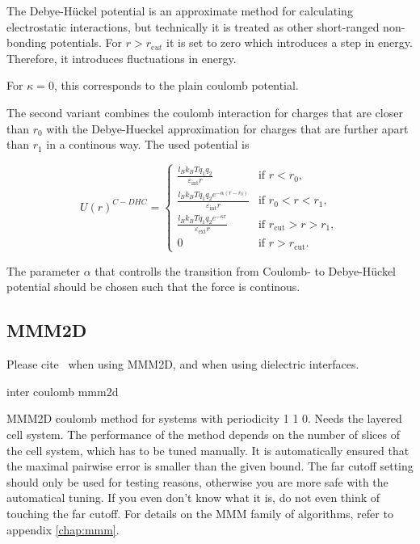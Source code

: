 The Debye-H\"uckel potential is an approximate method for calculating
electrostatic interactions, but technically it is treated as other
short-ranged non-bonding potentials. For $r>r_{\mathrm cut}$ it is set 
to zero which introduces a step in energy. Therefore, it introduces
fluctuations in energy.

For $\kappa = 0$, this corresponds to the plain coulomb potential.

The second variant combines the coulomb interaction for charges that are closer than $r_0$ with the Debye-Hueckel approximation for charges that are further apart than $r_1$ in a continous way. The used potential is 

\begin{equation}
  U(r)^{C-DHC} = 
  \begin{cases} 
    \frac{l_B k_B T q_1 q_2}{\varepsilon_{\text{int}} r} & \text{if } r < r_0, \\ 
    \frac{l_B k_B T q_1 q_2 e^{-\alpha (r - r_0)}}{\varepsilon_{\text{int}} r} & \text{if } r_0 < r < r_1,  \\
    \frac{l_B k_B T q_1 q_2 e^{-\kappa r}}{\varepsilon_{\text{ext}} r} & \text{if } r_{\text{cut}} > r > r_1,  \\
    0 & \text{if } r > r_{\text{cut}}.
  \end{cases}
\end{equation}

The parameter $\alpha$ that controlls the transition from Coulomb- to Debye-H\"uckel potential should be chosen such that the force is continous.

\subsection{MMM2D}

\begin{citebox}
  Please cite~ when using MMM2D, and
   when using dielectric interfaces.
\end{citebox}


\begin{essyntax}
 inter coulomb  mmm2d 
  \begin{features}
  \end{features}
\end{essyntax}
MMM2D coulomb method for systems with periodicity 1 1 0. Needs the
layered cell system. The performance of the method depends on the
number of slices of the cell system, which has to be tuned manually.
It is automatically ensured that the maximal pairwise error is smaller
than the given bound. The far cutoff setting should only be used for
testing reasons, otherwise you are more safe with the automatical
tuning. If you even don't know what it is, do not even think of
touching the far cutoff. For details on the MMM family of algorithms,
refer to appendix \vref{chap:mmm}.


